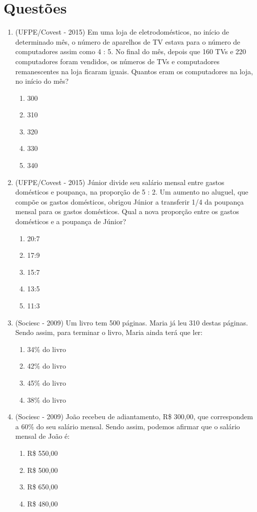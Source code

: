  \section{Questões}
 \begin{enumerate}
  \item (UFPE/Covest - 2015) Em uma loja de eletrodomésticos, no início de determinado mês, o número de aparelhos de TV estava para o número de computadores assim como 4 : 5. No final do mês, depois que 160 TVs e 220 computadores foram vendidos, os números de TVs e computadores remanescentes na loja ficaram iguais. Quantos eram os computadores na loja, no início do mês?
  \begin{enumerate}
  \item 300
  \item 310
  \item 320
  \item 330
  \item 340
  \end{enumerate}
  
  \item (UFPE/Covest - 2015) Júnior divide seu salário mensal entre gastos domésticos e poupança, na proporção de 5 : 2. Um aumento no aluguel, que compõe os gastos domésticos, obrigou Júnior a transferir 1/4 da poupança mensal para os gastos domésticos. Qual a nova proporção entre os gastos domésticos e a poupança de Júnior?
  \begin{enumerate}
  \item 20:7
  \item 17:9
  \item 15:7
  \item 13:5
  \item 11:3
  \end{enumerate}

 \item (Sociesc - 2009) Um livro tem 500 páginas. Maria já leu 310 destas páginas. Sendo assim, para terminar o livro, Maria ainda terá que ler:
  \begin{enumerate}
  \item 34\% do livro
  \item 42\% do livro
  \item 45\% do livro
  \item 38\% do livro
 \end{enumerate}
 
 \item (Sociesc - 2009) João recebeu de adiantamento, R\$ 300,00, que correspondem a 60\% do seu salário mensal. Sendo assim, podemos afirmar que o salário mensal de João é:
 \begin{enumerate}
  \item R\$ 550,00
  \item R\$ 500,00
  \item R\$ 650,00
  \item R\$ 480,00
 \end{enumerate}
 

\end{enumerate}
